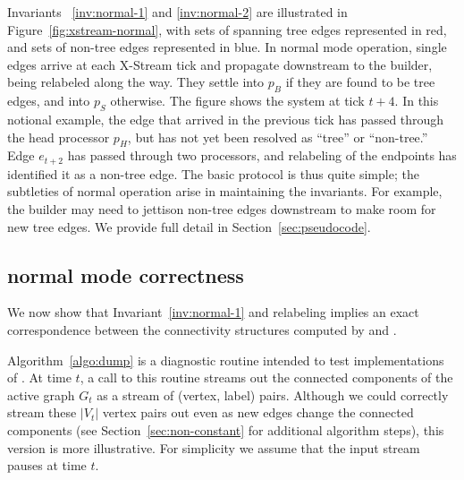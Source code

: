 Invariants ~\ref{inv:normal-1} and \ref{inv:normal-2} are illustrated in
Figure~\ref{fig:xstream-normal}, with sets of spanning tree edges represented
in red, and sets of non-tree edges represented in blue. In normal mode 
operation, single edges arrive at each X-Stream tick and propagate downstream
to the builder, being relabeled along the way. They settle into $p_B$ if 
they are
found to be tree edges, and into $p_S$ otherwise.  The figure
shows the system at \XStream tick $t+4$.  In this notional example, the
edge that arrived in the previous tick has passed through the head processor
$p_H$, but has not yet been resolved as ``tree'' or ``non-tree.''  Edge
$e_{t+2}$ has passed through two processors, and relabeling of the endpoints
has identified it as a non-tree edge. The basic protocol is thus quite simple;
the subtleties of \XSCC normal operation arise in maintaining the invariants. For example, the
builder may need to jettison non-tree edges downstream to make room for new tree edges.
We provide full detail in Section~\ref{sec:pseudocode}.

\subsection{\XSCC normal mode correctness}
We now show that Invariant~\ref{inv:normal-1} and
\XSCC relabeling implies an exact correspondence between
the connectivity structures computed by \XSCC and \DFRns.  

Algorithm~\ref{algo:dump} is a diagnostic routine intended to test
implementations of \XSCCns. At
\XStream time $t$, a call to this routine streams out the connected
components of the active graph $G_t$ as a stream of (vertex, label)
pairs.  Although we could correctly stream these $|V_t|$ vertex pairs
out even as new edges change the connected components (see
Section~\ref{sec:non-constant} for additional algorithm steps), this version is more illustrative.
For simplicity we assume that the input stream pauses at time $t$.

